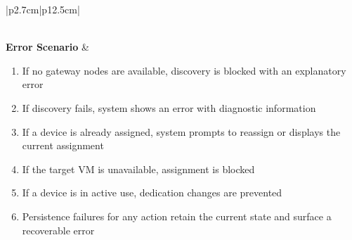\begin{table}[H]
\begin{tabular}{|p{2.7cm}|p{12.5cm}|}
\begin{minipage}[t]{\linewidth}
\begin{enumerate}[topsep=0pt,itemsep=1pt,parsep=0pt,partopsep=0pt]
            \end{enumerate}
        \end{minipage} \\
        \hline
        \textbf{Error Scenario} & \begin{minipage}[t]{\linewidth}
            \begin{enumerate}[topsep=0pt,itemsep=1pt,parsep=0pt,partopsep=0pt]
                \item If no gateway nodes are available, discovery is blocked with an explanatory error
                \item If discovery fails, system shows an error with diagnostic information
                \item If a device is already assigned, system prompts to reassign or displays the current assignment
                \item If the target VM is unavailable, assignment is blocked
                \item If a device is in active use, dedication changes are prevented
                \item Persistence failures for any action retain the current state and surface a recoverable error
            \end{enumerate}
        \end{minipage} \\
        \hline
    \end{tabular}
    \label{tab:admin-hardware-devices}
\end{table}
